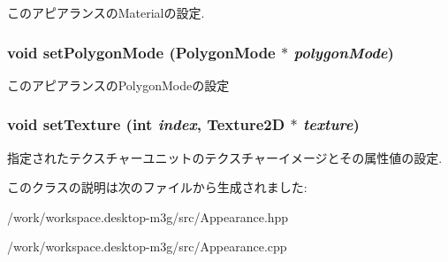 このアピアランスのMaterialの設定. \hypertarget{classm3g_1_1Appearance_cc21fac7868e2ad37e689ac642db1aae}{
\subsubsection[{setPolygonMode}]{\setlength{\rightskip}{0pt plus 5cm}void setPolygonMode ({\bf PolygonMode} $\ast$ {\em polygonMode})}}
\label{classm3g_1_1Appearance_cc21fac7868e2ad37e689ac642db1aae}


このアピアランスのPolygonModeの設定 \hypertarget{classm3g_1_1Appearance_493e54b1c7ab839b9e76b28e0629cf6a}{
\subsubsection[{setTexture}]{\setlength{\rightskip}{0pt plus 5cm}void setTexture (int {\em index}, \/  {\bf Texture2D} $\ast$ {\em texture})}}
\label{classm3g_1_1Appearance_493e54b1c7ab839b9e76b28e0629cf6a}


指定されたテクスチャーユニットのテクスチャーイメージとその属性値の設定. 

このクラスの説明は次のファイルから生成されました:\begin{CompactItemize}
\item 
/work/workspace.desktop-m3g/src/Appearance.hpp\item 
/work/workspace.desktop-m3g/src/Appearance.cpp\end{CompactItemize}
